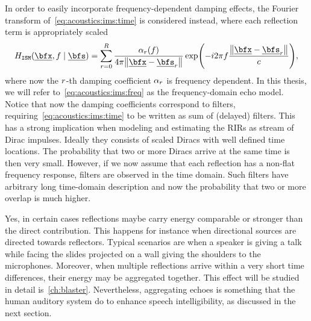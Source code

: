 \mynewline
In order to easily incorporate frequency-dependent damping effects, the Fourier transform of~\cref{eq:acoustics:ims:time} is considered instead, where
each reflection term is appropriately scaled
\begin{equation}\label{eq:acoustics:ims:freq}
    \rirFreq_{\mathtt{ISM}}(\positionMicrophone, f \mid \positionSource) =
        \sum_{\idxEch=0}^{\numEchs} \frac{\absCoeff_{\idxEch}(f)}{4 \pi \norm{\positionMicrophone - \positionSource_\idxEch}}
        \exp\kparen{- \csti 2 \pi f \frac{\norm{\positionMicrophone - \positionSource_\idxEch}}{\speedOfSound}}
        ,
\end{equation}
where now the $r$-th damping coefficient $\alpha_{r}$ is frequency dependent.
In this thesis, we will refer to~\cref{eq:acoustics:ims:freq} as the frequency-domain echo model.
\\Notice that now the damping coefficients correspond to filters, requiring~\cref{eq:acoustics:ims:time} to be written as sum of (delayed) filters.
This has a strong implication when modeling and estimating the \acp{RIR} as stream of Dirac impulses.
Ideally they consists of scaled Diracs with well defined time locations.
The probability that two or more Diracs arrive at the same time is then very small.
However, if we now assume that each reflection has a non-flat frequency response, filters are observed in the time domain.
Such filters have arbitrary long time-domain description and now the probability that two or more overlap is much higher.

 Yes, in certain cases reflections maybe carry energy comparable or stronger than the direct contribution.
This happens for instance when directional sources are directed towards reflectors.
Typical scenarios are when a speaker is giving a talk while facing the slides projected on a wall giving the shoulders to the microphones.
Moreover, when multiple reflections arrive within a very short time differences, their energy may be aggregated together.
This effect will be studied in detail is~\cref{ch:blaster}.
Nevertheless, aggregating echoes is something that the human auditory system do to enhance speech intelligibility, as discussed in the next section.


